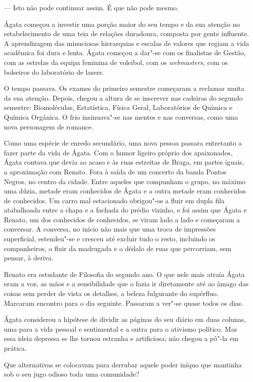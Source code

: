 --- Isto não pode continuar assim. É que não pode mesmo.

Ágata começou a investir uma porção maior do seu tempo e da sua atenção
no estabelecimento de uma teia de relações duradoura, composta por gente
influente. A aprendizagem das minuciosas hierarquias e escalas de
valores que regiam a vida acadêmica foi dura e lenta. Ágata começou a
dar"-se com os finalistas de Gestão, com as estrelas da equipa feminina
de voleibol, com os \emph{webmasters, }com os bolseiros do laboratório
de lasers.

O tempo passava. Os exames do primeiro semestre começaram a reclamar
muita da sua atenção. Depois, chegou a altura de se inscrever nas
cadeiras do segundo semestre: Biomoléculas, Estatística, Física Geral,
Laboratórios de Química  e Química Orgânica. O frio insinuava"-se nas
mentes e nas conversas, como uma nova personagem de romance.

Como uma espécie de enredo secundário, uma nova pessoa passara
entretanto a fazer parte da vida de Ágata. Com o humor ligeiro próprio
dos apaixonados, Ágata contava que
devia ao acaso e às ruas estreitas de Braga, em partes iguais, a
aproximação com Renato. Fora à saída de um concerto da banda Pontos
Negros, no centro da cidade. Entre aqueles que compunham o grupo, no
máximo uma dúzia, metade eram conhecidos de Ágata e a outra metade eram
conhecidos de conhecidos. Um carro mal estacionado obrigou"-os a fluir em
dupla fila atabalhoada entre a chapa e a fachada do prédio vizinho, e
foi assim que Ágata e Renato, um dos conhecidos de conhecidos, se viram
lado a lado e começaram a conversar. A conversa, no início não mais que
uma troca de impressões superficial, estendeu"-se e cresceu até excluir
tudo o resto, incluindo os companheiros, o fluir da madrugada e o
dédalo de ruas que percorriam, sem pensar, à deriva.

Renato era estudante de Filosofia do segundo ano. O que nele mais atraía
Ágata eram a voz, as mãos e a sensibilidade que o fazia ir diretamente
até ao âmago das coisas sem perder de vista os detalhes, a beleza
fulgurante do supérfluo. Marcaram encontro para o dia seguinte.
Passaram a ver"-se quase todos os dias.

Ágata considerou a hipótese de dividir as páginas do seu diário em duas
colunas, uma para a vida pessoal e sentimental e a outra para o
ativismo político. Mas essa ideia depressa se lhe tornou estranha e
artificiosa; não chegou a pô"-la em prática.

Que alternativas se colocavam para derrubar aquele poder iníquo que
mantinha sob o seu jugo odioso toda uma comunidade?

